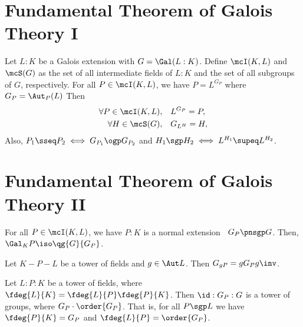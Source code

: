 \documentclass{article}
\begin{document}

\section{Fundamental Theorem of Galois Theory I}
\begin{ttheorem}
  Let \( L:K \) be a Galois extension with \( G = \Gal(L:K) \).
  Define \( \mcI(K,L) \) and \( \mcS(G) \) as the set of all intermediate fields of \( L:K \) and the set of all subgroups of \( G \), respectively.
  For all \( P\in \mcI(K,L) \), we have \( P = L^{G_P} \) where \( G_P = \Aut_P(L)\)
  Then \begin{align*}
    \forall P\in \mcI(K,L), \quad &L^{G_P} = P,\\
    \forall H\in \mcS(G), \quad &G_{L^H} = H,
  \end{align*}
  Also, \( P_1\sseq P_2 \iff G_{P_1}\ogp G_{P_2} \) and \( H_1 \sgp H_2 \iff L^{H_1}\supeq L^{H_2} \). %
\end{ttheorem}
\section{Fundamental Theorem of Galois Theory II}
\begin{ttheorem}
  For all \( P\in \mcI(K,L) \), we have \( P:K \) is a normal extension \iff~\( G_P\pnsgp G \).
  Then, \( \Gal_K P \iso \qg{G}{G_P} \).
\end{ttheorem}

\begin{tlemma}
  Let \( K-P-L \) be a tower of fields and \( g\in \Aut L \).
  Then \( G_{gP} = gG_Pg\inv \).
\end{tlemma}

\begin{tremark}
  Let \( L:P:K \) be a tower of fields, where \( \fdeg{L}{K} = \fdeg{L}{P}\fdeg{P}{K} \).
  Then \( \id:G_P:G \) is a tower of groups, where \( \index{G}{G_P}\cdot\order{G_P} \).
  That is, for all \( P\sgp L \) we have \( \fdeg{P}{K}=\index{G}{G_P} \) and \( \fdeg{L}{P} = \order{G_P} \).
\end{tremark}

\end{document}
